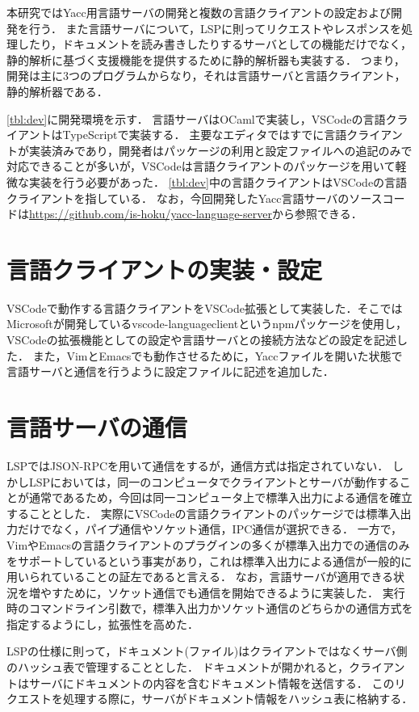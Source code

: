 \documentclass[fontsize=9bp,twocolumn,column_gap=2.36zw,a4paper,report]{jlreq}
\begin{document}
本研究ではYacc用言語サーバの開発と複数の言語クライアントの設定および開発を行う．
また言語サーバについて，LSPに則ってリクエストやレスポンスを処理したり，ドキュメントを読み書きしたりするサーバとしての機能だけでなく，静的解析に基づく支援機能を提供するために静的解析器も実装する．
つまり，開発は主に3つのプログラムからなり，それは言語サーバと言語クライアント，静的解析器である．\par
\ref{tbl:dev}に開発環境を示す．
言語サーバはOCamlで実装し，VSCodeの言語クライアントはTypeScriptで実装する．
主要なエディタではすでに言語クライアントが実装済みであり，開発者はパッケージの利用と設定ファイルへの追記のみで対応できることが多いが，VSCodeは言語クライアントのパッケージを用いて軽微な実装を行う必要があった．
\ref{tbl:dev}中の言語クライアントはVSCodeの言語クライアントを指している．
なお，今回開発したYacc言語サーバのソースコードは\url{https://github.com/is-hoku/yacc-language-server}から参照できる．

\section{言語クライアントの実装・設定}\label{sec:client}

VSCodeで動作する言語クライアントをVSCode拡張として実装した．そこではMicrosoftが開発しているvscode-languageclient\cite{vscode-languageclient}というnpmパッケージを使用し，VSCodeの拡張機能としての設定や言語サーバとの接続方法などの設定を記述した．
また，VimとEmacsでも動作させるために，Yaccファイルを開いた状態で言語サーバと通信を行うように設定ファイルに記述を追加した．

\section{言語サーバの通信}

LSPではJSON-RPCを用いて通信をするが，通信方式は指定されていない．
しかしLSPにおいては，同一のコンピュータでクライアントとサーバが動作することが通常であるため，今回は同一コンピュータ上で標準入出力による通信を確立することとした．
実際にVSCodeの言語クライアントのパッケージでは標準入出力だけでなく，パイプ通信やソケット通信，IPC通信が選択できる．
一方で，VimやEmacsの言語クライアントのプラグインの多くが標準入出力での通信のみをサポートしているという事実があり，これは標準入出力による通信が一般的に用いられていることの証左であると言える．
なお，言語サーバが適用できる状況を増やすために，ソケット通信でも通信を開始できるように実装した．
実行時のコマンドライン引数で，標準入出力かソケット通信のどちらかの通信方式を指定するようにし，拡張性を高めた．\par
LSPの仕様に則って，ドキュメント(ファイル)はクライアントではなくサーバ側のハッシュ表で管理することとした．
ドキュメントが開かれると，クライアントはサーバにドキュメントの内容を含むドキュメント情報を送信する．
このリクエストを処理する際に，サーバがドキュメント情報をハッシュ表に格納する．
\end{document}
